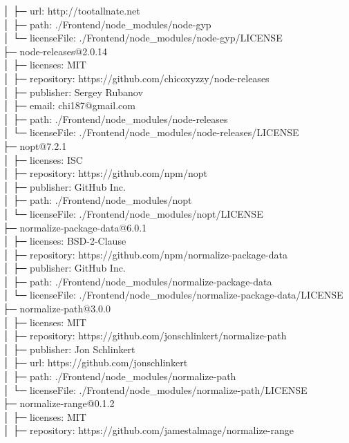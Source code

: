 │  ├─ url: http://tootallnate.net\\
│  ├─ path: ./Frontend/node\_modules/node-gyp\\
│  └─ licenseFile: ./Frontend/node\_modules/node-gyp/LICENSE\\
├─ node-releases@2.0.14\\
│  ├─ licenses: MIT\\
│  ├─ repository: https://github.com/chicoxyzzy/node-releases\\
│  ├─ publisher: Sergey Rubanov\\
│  ├─ email: chi187@gmail.com\\
│  ├─ path: ./Frontend/node\_modules/node-releases\\
│  └─ licenseFile: ./Frontend/node\_modules/node-releases/LICENSE\\
├─ nopt@7.2.1\\
│  ├─ licenses: ISC\\
│  ├─ repository: https://github.com/npm/nopt\\
│  ├─ publisher: GitHub Inc.\\
│  ├─ path: ./Frontend/node\_modules/nopt\\
│  └─ licenseFile: ./Frontend/node\_modules/nopt/LICENSE\\
├─ normalize-package-data@6.0.1\\
│  ├─ licenses: BSD-2-Clause\\
│  ├─ repository: https://github.com/npm/normalize-package-data\\
│  ├─ publisher: GitHub Inc.\\
│  ├─ path: ./Frontend/node\_modules/normalize-package-data\\
│  └─ licenseFile: ./Frontend/node\_modules/normalize-package-data/LICENSE\\
├─ normalize-path@3.0.0\\
│  ├─ licenses: MIT\\
│  ├─ repository: https://github.com/jonschlinkert/normalize-path\\
│  ├─ publisher: Jon Schlinkert\\
│  ├─ url: https://github.com/jonschlinkert\\
│  ├─ path: ./Frontend/node\_modules/normalize-path\\
│  └─ licenseFile: ./Frontend/node\_modules/normalize-path/LICENSE\\
├─ normalize-range@0.1.2\\
│  ├─ licenses: MIT\\
│  ├─ repository: https://github.com/jamestalmage/normalize-range\\
